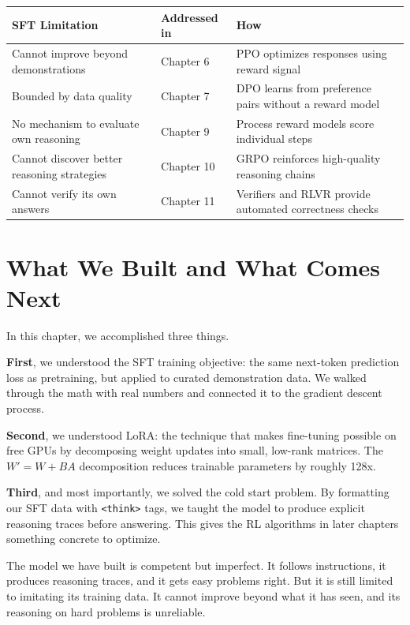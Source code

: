 \begin{chapterenv}
\begin{center}
\begin{tabular}{p{}p{}p{}}
\toprule
\textbf{SFT Limitation} & \textbf{Addressed in} & \textbf{How} \\
\midrule
Cannot improve beyond demonstrations & Chapter 6 & PPO optimizes responses using reward signal \\
Bounded by data quality & Chapter 7 & DPO learns from preference pairs without a reward model \\
No mechanism to evaluate own reasoning & Chapter 9 & Process reward models score individual steps \\
Cannot discover better reasoning strategies & Chapter 10 & GRPO reinforces high-quality reasoning chains \\
Cannot verify its own answers & Chapter 11 & Verifiers and RLVR provide automated correctness checks \\
\bottomrule
\end{tabular}
\end{center}

\section{What We Built and What Comes Next}

In this chapter, we accomplished three things.

\textbf{First}, we understood the SFT training objective: the same next-token prediction loss as pretraining, but applied to curated demonstration data. We walked through the math with real numbers and connected it to the gradient descent process.

\textbf{Second}, we understood LoRA: the technique that makes fine-tuning possible on free GPUs by decomposing weight updates into small, low-rank matrices. The $W' = W + BA$ decomposition reduces trainable parameters by roughly 128x.

\textbf{Third}, and most importantly, we solved the cold start problem. By formatting our SFT data with \texttt{<think>} tags, we taught the model to produce explicit reasoning traces before answering. This gives the RL algorithms in later chapters something concrete to optimize.

The model we have built is competent but imperfect. It follows instructions, it produces reasoning traces, and it gets easy problems right. But it is still limited to imitating its training data. It cannot improve beyond what it has seen, and its reasoning on hard problems is unreliable.


\end{chapterenv}
